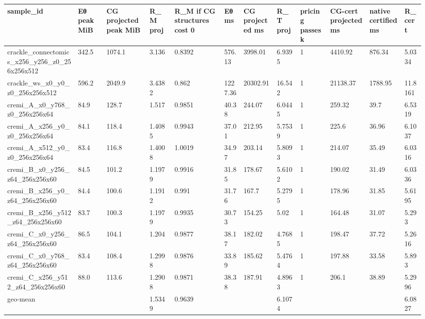 \begin{tabular}{llllllllllll}
\hline
sample\_id & Eθ peak MiB & CG projected peak MiB & R\_M proj & R\_M if CG structures cost 0 & Eθ ms & CG projected ms & R\_T proj & pricing passes k & CG-cert projected ms & native certified ms & R\_cert \\
\hline
crackle\_connectomics\_x256\_y256\_z0\_256x256x512 & 342.5 & 1074.1 & 3.136 & 0.8392 & 576.13 & 3998.01 & 6.9395 & 1 & 4410.92 & 876.34 & 5.0334 \\
crackle\_ws\_x0\_y0\_z0\_256x256x512 & 596.2 & 2049.9 & 3.4382 & 0.862 & 1227.36 & 20302.91 & 16.542 & 1 & 21138.37 & 1788.95 & 11.8161 \\
cremi\_A\_x0\_y768\_z0\_256x256x64 & 84.9 & 128.7 & 1.517 & 0.9851 & 40.38 & 244.07 & 6.0445 & 1 & 259.32 & 39.7 & 6.5319 \\
cremi\_A\_x256\_y0\_z0\_256x256x64 & 84.1 & 118.4 & 1.4085 & 0.9943 & 37.01 & 212.95 & 5.7539 & 1 & 225.6 & 36.96 & 6.1037 \\
cremi\_A\_x512\_y0\_z0\_256x256x64 & 83.4 & 116.8 & 1.4008 & 1.0019 & 34.97 & 203.14 & 5.8093 & 1 & 214.07 & 35.49 & 6.0316 \\
cremi\_B\_x0\_y256\_z64\_256x256x60 & 84.5 & 101.2 & 1.1979 & 0.9916 & 31.85 & 178.67 & 5.6102 & 1 & 190.02 & 31.49 & 6.0336 \\
cremi\_B\_x256\_y0\_z64\_256x256x60 & 84.4 & 100.6 & 1.1912 & 0.991 & 31.76 & 167.7 & 5.2795 & 1 & 178.96 & 31.85 & 5.6195 \\
cremi\_B\_x256\_y512\_z64\_256x256x60 & 83.7 & 100.3 & 1.1979 & 0.9935 & 30.73 & 154.25 & 5.02 & 1 & 164.48 & 31.07 & 5.293 \\
cremi\_C\_x0\_y256\_z64\_256x256x60 & 86.5 & 104.1 & 1.204 & 0.9877 & 38.17 & 182.02 & 4.7685 & 1 & 198.47 & 37.72 & 5.2616 \\
cremi\_C\_x0\_y768\_z64\_256x256x60 & 83.4 & 108.4 & 1.2998 & 0.9876 & 33.89 & 185.62 & 5.4764 & 1 & 197.88 & 33.58 & 5.893 \\
cremi\_C\_x256\_y512\_z64\_256x256x60 & 88.0 & 113.6 & 1.2908 & 0.9871 & 38.38 & 187.91 & 4.8963 & 1 & 206.1 & 38.89 & 5.2996 \\
geo-mean &  &  & 1.5349 & 0.9639 &  &  & 6.1074 &  &  &  & 6.0827 \\
\hline
\end{tabular}
